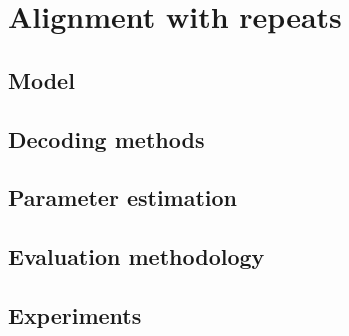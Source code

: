 \chapter{Alignment with repeats}

\section{Model}
\section{Decoding methods}
\section{Parameter estimation}
\section{Evaluation methodology}
\section{Experiments}
\label{LastPage}
